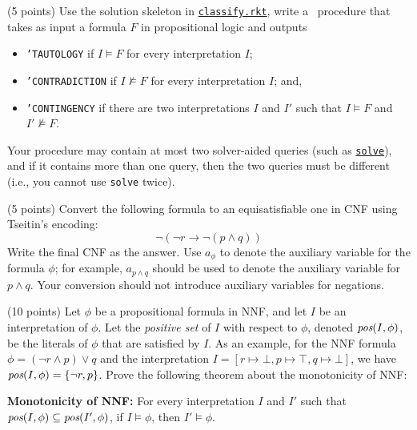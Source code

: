 \documentclass{handout}
\begin{document}
\begin{questions}

\item (5 points) \label{prob:classify} Use the solution skeleton in \href{\gitlabpath/hw1/logic/classify.rkt}{\texttt{classify.rkt}},
write a \rosette\ procedure that takes as input a formula $F$ in propositional logic and outputs
\begin{itemize}
\item \texttt{'TAUTOLOGY} if $I \models F$ for every interpretation $I$;
\item \texttt{'CONTRADICTION} if $I \not\models F$ for every interpretation $I$; and,
\item \texttt{'CONTINGENCY} if there are two interpretations $I$ and $I'$ such that $I\models F$ and $I'\not\models F$.
\end{itemize}
Your procedure may contain at most two solver-aided queries (such as \href{https://docs.racket-lang.org/rosette-guide/ch_syntactic-forms_rosette.html#%28form._%28%28lib._rosette%2Fquery%2Fform..rkt%29._solve%29%29}{\texttt{solve}}),
and if it contains more than one query, then the two queries must be different (i.e., you cannot use \texttt{solve} twice).



\item (5 points)  Convert the following formula to an equisatisfiable one in CNF using Tseitin's encoding:
\[\neg ( \neg r \rightarrow \neg (p \land q))\]
Write the final CNF as the answer.
Use $a_\phi$ to denote the auxiliary variable for the formula $\phi$;
for example, $a_{p\wedge q}$ should be used to denote the auxiliary variable for $p\wedge q$.
Your conversion should not introduce auxiliary variables for negations.



\item (10 points)  Let $\phi$ be a propositional formula in NNF, and let $I$ be an interpretation of $\phi$. Let the \emph{positive set} of $I$ with respect to $\phi$, denoted $\emph{pos}(I, \phi)$, be the literals of $\phi$ that are satisfied by $I$. As an example, for the NNF formula $\phi = (\neg r \land p) \lor q$ and the interpretation $I = [r \mapsto \bot, p \mapsto \top, q \mapsto \bot]$, we have $\emph{pos}(I, \phi) = \{ \neg r, p \}$. Prove the following theorem about the monotonicity of NNF:

{\bf Monotonicity of NNF:} For every interpretation $I$ and $I'$ such that $\emph{pos}(I, \phi) \subseteq \emph{pos}(I', \phi)$, if $I \models \phi$, then $I' \models \phi$.


\end{questions}
\end{document}
